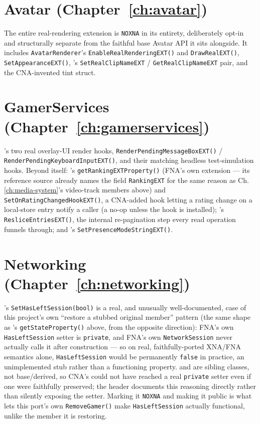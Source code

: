 \section{Avatar (Chapter~\ref{ch:avatar})}

The entire  real-rendering extension is \texttt{NOXNA} in its
entirety, deliberately opt-in and structurally separate from the faithful base Avatar API it
sits alongside. It includes \texttt{AvatarRenderer}'s \texttt{EnableRealRenderingEXT()} and
\texttt{DrawRealEXT()}, \texttt{SetAppearanceEXT()}, 's
\texttt{SetRealClipNameEXT} / \texttt{GetRealClipNameEXT} pair, and the CNA-invented
 tint struct.

\section{GamerServices (Chapter~\ref{ch:gamerservices})}

's two real overlay-UI render hooks,
\texttt{RenderPendingMessageBoxEXT()} / \texttt{RenderPending\allowbreak{}Keyboard\allowbreak{}InputEXT()}, and their
matching headless test-simulation hooks. Beyond  itself: 's
\texttt{getRankingEXTProperty()} (FNA's own extension --- its reference source already names
the field \texttt{RankingEXT} for the same reason as Ch.\ref{ch:media-system}'s video-track members above) and
\texttt{SetOnRatingChangedHookEXT()}, a CNA-added hook letting a rating change on a local-store
entry notify a caller (a no-op unless the hook is installed); 's
\texttt{ResliceEntriesEXT()}, the internal re-pagination step every read operation funnels
through; and 's \texttt{SetPresenceModeStringEXT()}.

\section{Networking (Chapter~\ref{ch:networking})}

's \texttt{SetHasLeftSession(bool)} is a real, and unusually
well-documented, case of this project's own ``restore a stubbed original member'' pattern (the
same shape as 's \texttt{getStateProperty()} above, from the opposite
direction): FNA's own \texttt{HasLeftSession} setter is \texttt{private}, and FNA's own
\texttt{NetworkSession} never actually calls it after construction --- so on real, faithfully-ported
XNA/FNA semantics alone, \texttt{HasLeftSession} would be permanently \texttt{false} in
practice, an unimplemented stub rather than a functioning property. 
and  are sibling classes, not base/derived, so CNA's
 could not have reached a real \texttt{private} setter
even if one were faithfully preserved; the header documents this reasoning directly rather than
silently exposing the setter. Marking it \texttt{NOXNA} and making it public is what lets this
port's own \texttt{RemoveGamer()} make \texttt{HasLeftSession} actually functional, unlike the
member it is restoring.

